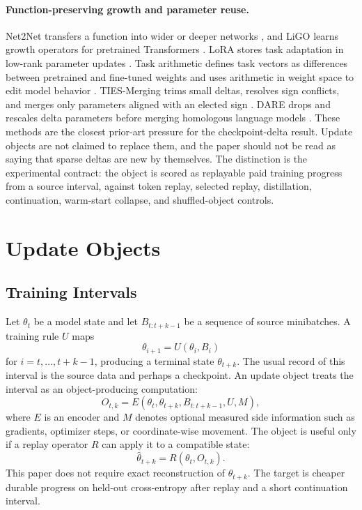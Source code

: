 \documentclass{article}
\begin{document}
\paragraph{Function-preserving growth and parameter reuse.}
Net2Net transfers a function into wider or deeper networks
\citep{chen2015net2net}, and LiGO learns growth operators for pretrained
Transformers \citep{wang2023ligo}. LoRA stores task adaptation in low-rank
parameter updates \citep{hu2022lora}. Task arithmetic defines task vectors as
differences between pretrained and fine-tuned weights and uses arithmetic in
weight space to edit model behavior \citep{ilharco2023taskarithmetic}.
TIES-Merging trims small deltas, resolves sign conflicts, and merges only
parameters aligned with an elected sign \citep{yadav2023ties}. DARE drops and
rescales delta parameters before merging homologous language models
\citep{yu2024supermario}. These methods are the closest prior-art pressure for
the checkpoint-delta result. Update objects are not claimed to replace them,
and the paper should not be read as saying that sparse deltas are new by
themselves. The distinction is the experimental contract: the object is scored
as replayable paid training progress from a source interval, against token
replay, selected replay, distillation, continuation, warm-start collapse, and
shuffled-object controls.

\section{Update Objects}

\subsection{Training Intervals}

Let $\theta_t$ be a model state and let $B_{t:t+k-1}$ be a sequence of source
minibatches. A training rule $U$ maps
\begin{equation}
  \theta_{i+1} = U(\theta_i, B_i)
\end{equation}
for $i=t,\ldots,t+k-1$, producing a terminal state $\theta_{t+k}$. The usual
record of this interval is the source data and perhaps a checkpoint. An update
object treats the interval as an object-producing computation:
\begin{equation}
  O_{t,k} = E(\theta_t, \theta_{t+k}, B_{t:t+k-1}, U, M),
\end{equation}
where $E$ is an encoder and $M$ denotes optional measured side information such
as gradients, optimizer steps, or coordinate-wise movement. The object is
useful only if a replay operator $R$ can apply it to a compatible state:
\begin{equation}
  \widehat{\theta}_{t+k} = R(\theta_t, O_{t,k}).
\end{equation}
This paper does not require exact reconstruction of $\theta_{t+k}$. The target
is cheaper durable progress on held-out cross-entropy after replay and a short
continuation interval.
\end{document}
